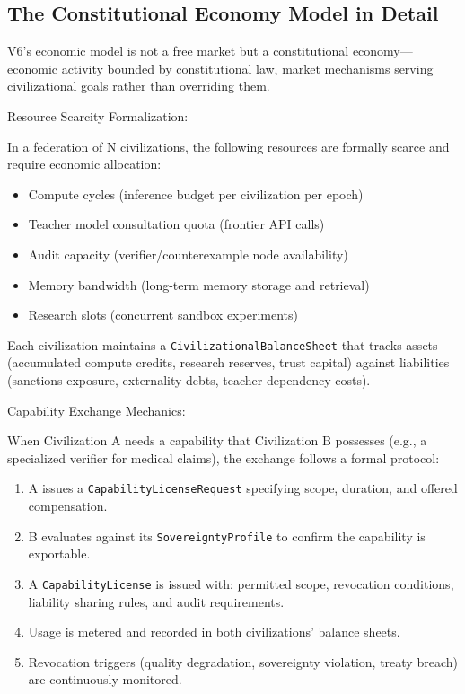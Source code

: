 \documentclass[12pt,a4paper]{article}
\begin{document}
\subsection{The Constitutional Economy Model in Detail}


V6's economic model is not a free market but a constitutional economy---economic activity bounded by constitutional law, market mechanisms serving civilizational goals rather than overriding them.

Resource Scarcity Formalization:

In a federation of N civilizations, the following resources are formally scarce and require economic allocation:
\begin{itemize}
  \item Compute cycles (inference budget per civilization per epoch)
  \item Teacher model consultation quota (frontier API calls)
  \item Audit capacity (verifier/counterexample node availability)
  \item Memory bandwidth (long-term memory storage and retrieval)
  \item Research slots (concurrent sandbox experiments)
\end{itemize}


Each civilization maintains a \texttt{CivilizationalBalanceSheet} that tracks assets (accumulated compute credits, research reserves, trust capital) against liabilities (sanctions exposure, externality debts, teacher dependency costs).

Capability Exchange Mechanics:

When Civilization A needs a capability that Civilization B possesses (e.g., a specialized verifier for medical claims), the exchange follows a formal protocol:
\begin{enumerate}
  \item A issues a \texttt{CapabilityLicenseRequest} specifying scope, duration, and offered compensation.
  \item B evaluates against its \texttt{SovereigntyProfile} to confirm the capability is exportable.
  \item A \texttt{CapabilityLicense} is issued with: permitted scope, revocation conditions, liability sharing rules, and audit requirements.
  \item Usage is metered and recorded in both civilizations' balance sheets.
  \item Revocation triggers (quality degradation, sovereignty violation, treaty breach) are continuously monitored.
\end{enumerate}
\end{document}
